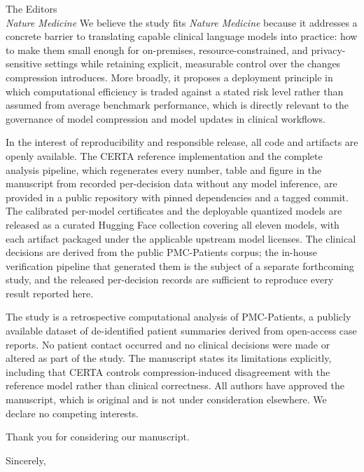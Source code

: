 \documentclass[11pt]{letter}
\begin{document}
\begin{letter}{The Editors\\
\textit{Nature Medicine}}
We believe the study fits \textit{Nature Medicine} because it addresses a concrete barrier to translating capable clinical language models into practice: how to make them small enough for on-premises, resource-constrained, and privacy-sensitive settings while retaining explicit, measurable control over the changes compression introduces. More broadly, it proposes a deployment principle in which computational efficiency is traded against a stated risk level rather than assumed from average benchmark performance, which is directly relevant to the governance of model compression and model updates in clinical workflows.

In the interest of reproducibility and responsible release, all code and artifacts are openly available. The CERTA reference implementation and the complete analysis pipeline, which regenerates every number, table and figure in the manuscript from recorded per-decision data without any model inference, are provided in a public repository with pinned dependencies and a tagged commit. The calibrated per-model certificates and the deployable quantized models are released as a curated Hugging Face collection covering all eleven models, with each artifact packaged under the applicable upstream model licenses. The clinical decisions are derived from the public PMC-Patients corpus; the in-house verification pipeline that generated them is the subject of a separate forthcoming study, and the released per-decision records are sufficient to reproduce every result reported here.

The study is a retrospective computational analysis of PMC-Patients, a publicly available dataset of de-identified patient summaries derived from open-access case reports. No patient contact occurred and no clinical decisions were made or altered as part of the study. The manuscript states its limitations explicitly, including that CERTA controls compression-induced disagreement with the reference model rather than clinical correctness. All authors have approved the manuscript, which is original and is not under consideration elsewhere. We declare no competing interests.

Thank you for considering our manuscript.

\closing{Sincerely,}

\end{letter}
\end{document}
